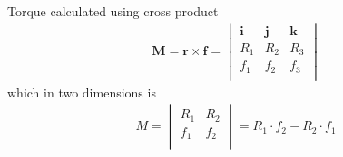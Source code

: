 Torque calculated using cross product
\begin{align}
\mathbf{M} = \mathbf{r} \times \mathbf{f} =  \begin{vmatrix} \mathbf{i} & \mathbf{j} & \mathbf{k} \\ R_{1} & R_{2} & R_{3} \\ f_{1} & f_{2} & f_{3} \\ \end{vmatrix} 
\end{align}
which in two dimensions is
\begin{align}
M = \begin{vmatrix} R_{1} & R_{2} \\ f_{1} & f_{2} \\ \end{vmatrix} = R_{1} \cdot f_{2} - R_{2} \cdot f_{1}
\end{align}